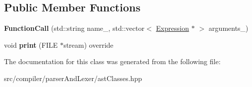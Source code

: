 \subsection*{Public Member Functions}
\begin{DoxyCompactItemize}
\item 
{\bfseries Function\+Call} (std\+::string name\+\_\+, std\+::vector$<$ \hyperlink{classslang__AST__NODES_1_1Expression}{Expression} $\ast$ $>$ arguments\+\_\+)\hypertarget{classslang__AST__NODES_1_1FunctionCall_a02b913fb8644a160f3122dd6fef284b6}{}\label{classslang__AST__NODES_1_1FunctionCall_a02b913fb8644a160f3122dd6fef284b6}

\item 
void {\bfseries print} (F\+I\+LE $\ast$stream) override\hypertarget{classslang__AST__NODES_1_1FunctionCall_a23baa8b7ddd506c72072df66af4ccbdd}{}\label{classslang__AST__NODES_1_1FunctionCall_a23baa8b7ddd506c72072df66af4ccbdd}

\end{DoxyCompactItemize}


The documentation for this class was generated from the following file\+:\begin{DoxyCompactItemize}
\item 
src/compiler/parser\+And\+Lexer/ast\+Classes.\+hpp\end{DoxyCompactItemize}
